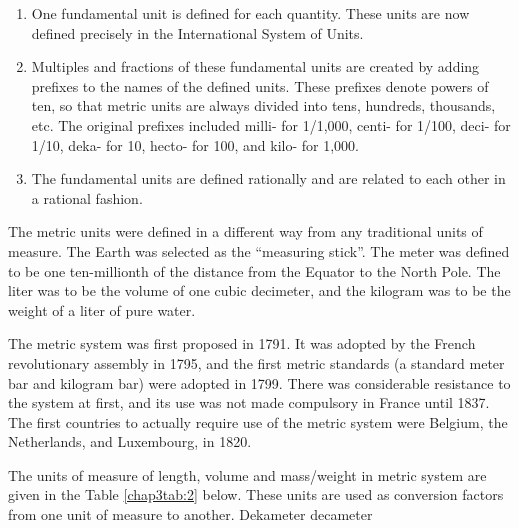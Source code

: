 \begin{enumerate}
\item One fundamental unit is defined for each quantity. These units are now defined precisely
in the International System of Units.
\item Multiples and fractions of these fundamental units are created by adding prefixes to the
names of the defined units. These prefixes denote powers of ten, so that metric units are
always divided into tens, hundreds, thousands, etc. The original prefixes included milli- for
1/1,000, centi- for 1/100, deci- for 1/10, deka- for 10, hecto- for 100, and kilo- for 1,000.
\item The fundamental units are defined rationally and are related to each other in a rational
fashion.
\end{enumerate}

The metric units were defined in a different way from any traditional units of
measure. The Earth was selected as the “measuring stick”. The meter was defined to be one
ten-millionth of the distance from the Equator to the North Pole. The liter was to be the
volume of one cubic decimeter, and the kilogram was to be the weight of a liter of pure
water.

The metric system was first proposed in 1791. It was adopted by the French
revolutionary assembly in 1795, and the first metric standards (a standard meter bar and
kilogram bar) were adopted in 1799. There was considerable resistance to the system at
first, and its use was not made compulsory in France until 1837. The first countries to
actually require use of the metric system were Belgium, the Netherlands, and Luxembourg,
in 1820.

The units of measure of length, volume and mass/weight in metric system are given in
the Table \eqref{chap3tab:2} below. These units are used as conversion factors from one unit of measure to
another. Dekameter decameter

